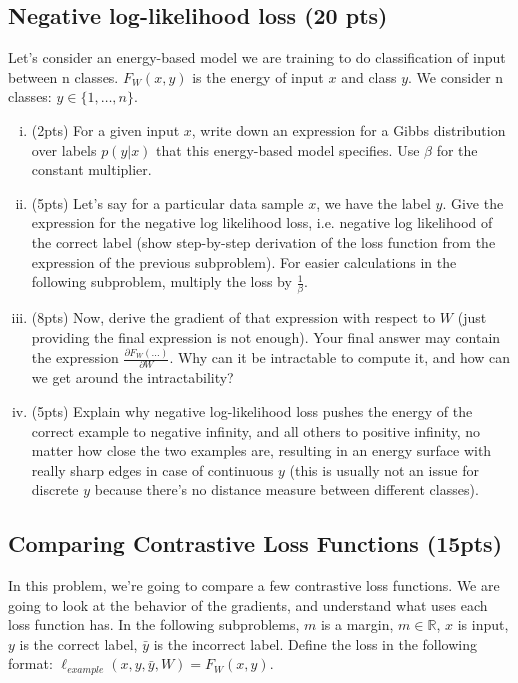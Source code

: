 \documentclass{article}
\newcommand{\R}{\mathbb{R}}	%
\begin{document}
\subsection{Negative log-likelihood loss (20 pts) }

Let's consider an energy-based model we are training to do classification of input between n classes. $F_W(x, y)$ is the energy of input $x$ and class $y$. We consider n classes: $y \in \{1, \dots, n\}$.

\begin{enumerate}[(i)]
\item (2pts) For a given input $x$, write down an expression for a Gibbs distribution over labels $p(y|x)$ that this energy-based model specifies. Use $\beta$ for the constant multiplier.
 


\item (5pts) Let's say for a particular data sample $x$, we have the label $y$. Give the expression for the negative log likelihood loss, i.e. negative log likelihood of the correct label (show step-by-step derivation of the loss function from the expression of the previous subproblem). For easier calculations in the following subproblem, multiply the loss by $\frac{1}{\beta}$.


\item (8pts) Now, derive the gradient of that expression with respect to $W$ (just providing the final expression is not enough). Your final answer may contain the expression $\frac{\partial F_W(...)}{\partial W}$. Why can it be intractable to compute it, and how can we get around the intractability? 



\item (5pts) Explain why negative log-likelihood loss pushes the energy of the correct example to negative infinity, and all others to positive infinity, no matter how close the two examples are, resulting in an energy surface with really sharp edges in case of continuous $y$ (this is usually not an issue for discrete $y$ because there's no distance measure between different classes).


\end{enumerate}

\subsection{Comparing Contrastive Loss Functions (15pts)}

In this problem, we're going to compare a few contrastive loss functions. We are going to look at the behavior of the gradients, and understand what uses each loss function has. In the following subproblems, $m$ is a margin, $m \in \R$, $x$ is input, $y$ is the correct label, $\bar y$ is the incorrect label. Define the loss in the following format: $\ell_{example}(x, y, \bar y, W) = F_W(x, y)$.
\end{document}
